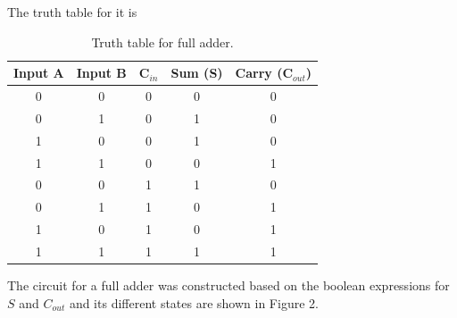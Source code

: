 \documentclass{article}
\begin{document}
	The truth table for it is
	\begin{table}[H]
		\centering
		\begin{tabular}{|c|c|c|c|c|}
			\hline
			Input A & Input B & C$_{in}$ & Sum (S) & Carry (C$_{out}$)\\
			\hline 
			0 & 0 & 0 & 0 & 0\\
			0 & 1 & 0 & 1 & 0\\
			1 & 0 & 0 & 1 & 0\\
			1 & 1 & 0 & 0 & 1\\
			\hline
			0 & 0 & 1 & 1 & 0\\
			0 & 1 & 1 & 0 & 1\\
			1 & 0 & 1 & 0 & 1\\
			1 & 1 & 1 & 1 & 1\\
			\hline
		\end{tabular}
		\caption{Truth table for full adder.}
	\end{table}
	
	The circuit for a full adder was constructed based on the boolean expressions for $S$ and $C_{out}$ and its different states are shown in Figure 2.
	
\end{document}
